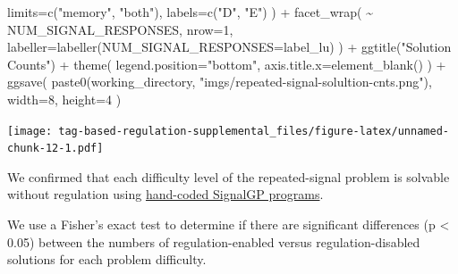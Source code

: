 \documentclass[
]{book}
\newenvironment{Shaded}{\begin{snugshade}}{\end{snugshade}}
\newcommand{\AttributeTok}[1]{\textcolor[rgb]{0.77,0.63,0.00}{#1}}
\newcommand{\DecValTok}[1]{\textcolor[rgb]{0.00,0.00,0.81}{#1}}
\newcommand{\FunctionTok}[1]{\textcolor[rgb]{0.00,0.00,0.00}{#1}}
\newcommand{\NormalTok}[1]{#1}
\newcommand{\SpecialCharTok}[1]{\textcolor[rgb]{0.00,0.00,0.00}{#1}}
\newcommand{\StringTok}[1]{\textcolor[rgb]{0.31,0.60,0.02}{#1}}
\begin{document}
\begin{Shaded}
\begin{Highlighting}[]
    \AttributeTok{limits=}\FunctionTok{c}\NormalTok{(}\StringTok{"memory"}\NormalTok{, }\StringTok{"both"}\NormalTok{),}
    \AttributeTok{labels=}\FunctionTok{c}\NormalTok{(}\StringTok{"D"}\NormalTok{, }\StringTok{"E"}\NormalTok{)}
\NormalTok{  ) }\SpecialCharTok{+}
  \FunctionTok{facet\_wrap}\NormalTok{(}
    \SpecialCharTok{\textasciitilde{}}\NormalTok{ NUM\_SIGNAL\_RESPONSES,}
    \AttributeTok{nrow=}\DecValTok{1}\NormalTok{,}
    \AttributeTok{labeller=}\FunctionTok{labeller}\NormalTok{(}\AttributeTok{NUM\_SIGNAL\_RESPONSES=}\NormalTok{label\_lu)}
\NormalTok{  ) }\SpecialCharTok{+}
  \FunctionTok{ggtitle}\NormalTok{(}\StringTok{"Solution Counts"}\NormalTok{) }\SpecialCharTok{+}
  \FunctionTok{theme}\NormalTok{(}
    \AttributeTok{legend.position=}\StringTok{"bottom"}\NormalTok{,}
    \AttributeTok{axis.title.x=}\FunctionTok{element\_blank}\NormalTok{()}
\NormalTok{  ) }\SpecialCharTok{+}
  \FunctionTok{ggsave}\NormalTok{(}
    \FunctionTok{paste0}\NormalTok{(working\_directory, }\StringTok{"imgs/repeated{-}signal{-}solultion{-}cnts.png"}\NormalTok{),}
    \AttributeTok{width=}\DecValTok{8}\NormalTok{,}
    \AttributeTok{height=}\DecValTok{4}
\NormalTok{  )}
\end{Highlighting}
\end{Shaded}

\texttt{[image: tag-based-regulation-supplemental\_files/figure-latex/unnamed-chunk-12-1.pdf]}

We confirmed that each difficulty level of the repeated-signal problem is solvable without regulation using \href{https://github.com/amlalejini/Tag-based-Genetic-Regulation-for-LinearGP/blob/master/documents/handcoded-examples.md}{hand-coded SignalGP programs}.

We use a Fisher's exact test to determine if there are significant differences (p \textless{} 0.05) between the numbers of regulation-enabled versus regulation-disabled solutions for each problem difficulty.
\end{document}
